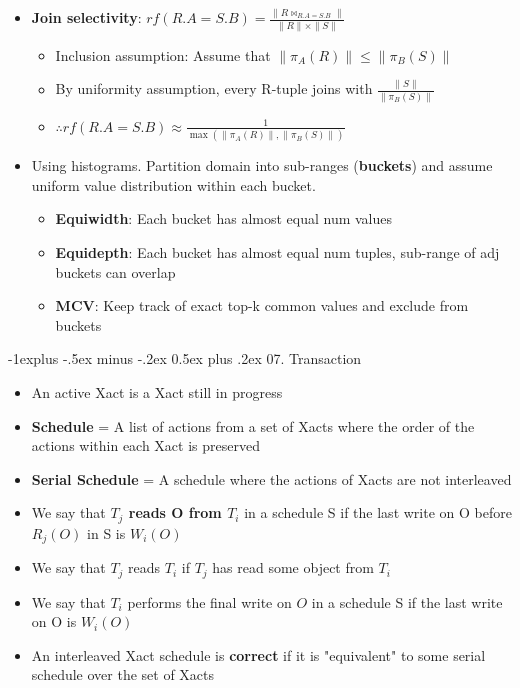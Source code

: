 \documentclass[8pt, landscape]{extarticle}
\makeatletter
\renewcommand{\subsection}{\@startsection{subsection}{2}{0mm}%
  {-1explus -.5ex minus -.2ex}%
  {0.5ex plus .2ex}%
{\normalfont\normalsize\bfseries}}
\makeatother
\begin{document}
\begin{multicols*}{4}
\begin{itemize}
      \item \textbf{Join selectivity}: $rf(R.A = S.B) = \frac{\lVert R \bowtie_{R.A = S.B} \lVert}{\lVert R \lVert \times \lVert S \lVert}$
      \begin{itemize}
        \item Inclusion assumption: Assume that $\lVert \pi_A(R) \lVert \leq \lVert \pi_B(S) \lVert$
        \item By uniformity assumption, every R-tuple joins with $\frac{\lVert S \lVert}{\lVert \pi_B(S) \lVert}$
        \item $\therefore rf(R.A = S.B) \approx \frac{1}{\max(\lVert \pi_A(R) \lVert, \lVert \pi_B(S) \lVert)}$ 
      \end{itemize}
      \item Using histograms. Partition domain into sub-ranges (\textbf{buckets}) and assume uniform value distribution within each bucket.
      \begin{itemize}
        \item \textbf{Equiwidth}: Each bucket has almost equal num values
        \item \textbf{Equidepth}: Each bucket has almost equal num tuples, sub-range of adj buckets can overlap
        \item \textbf{MCV}: Keep track of exact top-k common values and exclude from buckets 
      \end{itemize}
    \end{itemize}
  \subsection{07. Transaction}

  \begin{itemize}
    \item An active Xact is a Xact still in progress
    \item \textbf{Schedule} = A list of actions from a set of Xacts where the order of the actions within each Xact is preserved
    \item \textbf{Serial Schedule} = A schedule where the actions of Xacts are not interleaved
    \item We say that \textbf{$T_j$ reads O from $T_i$} in a schedule S if the last write on O before $R_j(O)$ in S is $W_i(O)$ 
    \item We say that $T_j$ reads $T_i$ if $T_j$ has read some object from $T_i$ 
    \item We say that $T_i$ performs the final write on $O$ in a schedule S if the last write on O is $W_i(O)$
    \item An interleaved Xact schedule is \textbf{correct} if it is "equivalent" to some serial schedule over the set of Xacts 
  \end{itemize}
  

\end{multicols*}
\end{document}
